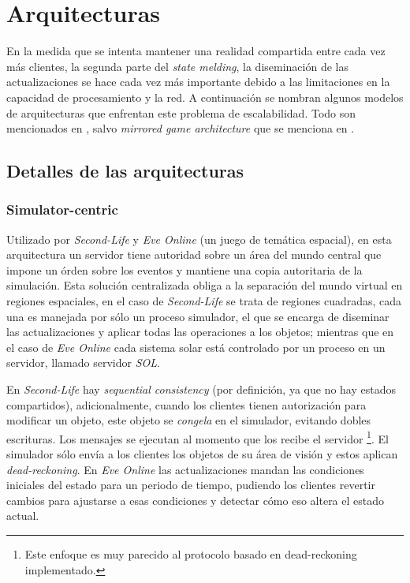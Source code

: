 \section{Arquitecturas}

En la medida que se intenta mantener una realidad compartida entre cada vez más clientes, la segunda parte del \emph{state melding}, la diseminación de las actualizaciones se hace cada vez más importante debido a las limitaciones en la capacidad de procesamiento y la red. A continuación se nombran algunos modelos de arquitecturas que enfrentan este problema de escalabilidad. Todo son mencionados en \cite{liu2012survey}, salvo \emph{mirrored game architecture} que se menciona en \cite{cronin2004efficient}.

\subsection{Detalles de las arquitecturas}

\subsubsection{Simulator-centric}

Utilizado por \emph{Second-Life} y \emph{Eve Online} (un juego de temática espacial), en esta arquitectura un servidor tiene autoridad sobre un área del mundo central que impone un órden sobre los eventos y mantiene una copia autoritaria de la simulación. Esta solución centralizada obliga a la separación del mundo virtual en regiones espaciales, en el caso de \emph{Second-Life} se trata de regiones cuadradas, cada una es manejada por sólo un proceso simulador, el que se encarga de diseminar las actualizaciones y aplicar todas las operaciones a los objetos; mientras que en el caso de \emph{Eve Online} cada sistema solar está controlado por un proceso en un servidor, llamado servidor \emph{SOL}.

En \emph{Second-Life} hay \emph{sequential consistency} (por definición, ya que no hay estados compartidos), adicionalmente, cuando los clientes tienen autorización para modificar un objeto, este objeto se \emph{congela} en el simulador, evitando dobles escrituras. Los mensajes se ejecutan al momento que los recibe el servidor \footnote{Este enfoque es muy parecido al protocolo basado en dead-reckoning implementado.}. El simulador sólo envía a los clientes los objetos de su área de visión y estos aplican \emph{dead-reckoning}. En \emph{Eve Online} las actualizaciones mandan las condiciones iniciales del estado para un periodo de tiempo, pudiendo los clientes revertir cambios para ajustarse a esas condiciones y detectar cómo eso altera el estado actual.

